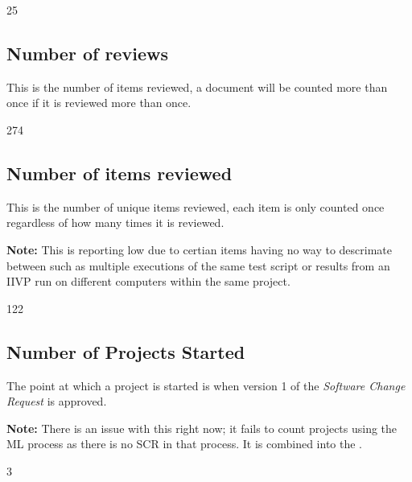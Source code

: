 \documentclass{article}
\begin{document}
\begin{Schunk}
\begin{Soutput}
[1] 25
\end{Soutput}
\end{Schunk}

\subsection{Number of reviews}
This is the number of items reviewed, a document will be counted more than once
if it is reviewed more than once.

\begin{Schunk}
\begin{Soutput}
[1] 274
\end{Soutput}
\end{Schunk}

\subsection{Number of items reviewed}
This is the number of unique items reviewed, each item is only counted once
regardless of how many times it is reviewed.

\textbf{Note:} This is reporting low due to certian items having no way to
descrimate between such as multiple executions of the same test script or
results from an IIVP run on different computers within the same project.

\begin{Schunk}
\begin{Soutput}
[1] 122
\end{Soutput}
\end{Schunk}

\subsection{Number of Projects Started}
The point at which a project is started is when version 1 of the \textit{Software
Change Request} is approved.

\textbf{Note:} There is an issue with this right now; it fails to count projects using the ML process
as there is no SCR in that process. It is combined into the .

\begin{Schunk}
\begin{Soutput}
[1] 3
\end{Soutput}
\end{Schunk}
\end{document}
